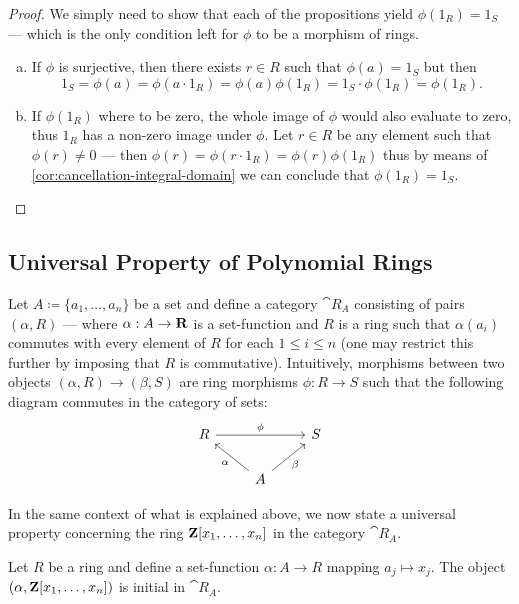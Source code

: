 %
\begin{proof}
    We simply need to show that each of the propositions yield \(\phi(1_R) = 1_S\)
    --- which is the only condition left for \(\phi\) to be a morphism of rings.
    \begin{enumerate}[(a)]\setlength\itemsep{0em}
        \item If \(\phi\) is surjective, then there exists \(r \in R\) such that
              \(\phi(a) = 1_S\) but then
              \[
                  1_S = \phi(a) = \phi(a \cdot 1_R) = \phi(a) \phi(1_R)
                  = 1_S \cdot \phi(1_R) = \phi(1_R).
              \]

        \item If \(\phi(1_R)\) where to be zero, the whole image of \(\phi\) would also
              evaluate to zero, thus \(1_R\) has a non-zero image under \(\phi\). Let
              \(r \in R\) be any element such that \(\phi(r) \neq 0\) --- then
              \(\phi(r) = \phi(r \cdot 1_R) = \phi(r) \phi(1_R)\) thus by means of
              \cref{cor:cancellation-integral-domain} we can conclude that
              \(\phi(1_R) = 1_S\).
    \end{enumerate}
\end{proof}
%

\subsection{Universal Property of Polynomial Rings}

Let \(A \coloneq \{a_1, \dots, a_n\}\) be a set and define a category
\(\cat R_A\) consisting of pairs \((\alpha, R)\) --- where \(\alpha: A \to \mathbf{R}\)
is a set-function and \(R\) is a ring such that \(\alpha(a_i)\) commutes with
every element of \(R\) for each \(1 \leq i \leq n\) (one may restrict this
further by imposing that \(R\) is commutative). Intuitively, morphisms between
two objects \((\alpha, R) \to (\beta, S)\) are ring morphisms \(\phi: R \to S\)
such that the following diagram commutes in the category of sets:
\[
    \begin{tikzcd}
        R \ar[rr, "\phi"] & &S \\
        &A \ar[lu, "\alpha"] \ar[ru, swap, "\beta"] &
    \end{tikzcd}
\]

In the same context of what is explained above, we now state a universal
property concerning the ring \(\mathbf{Z}[x_1, \dots, x_n]\) in the category
\(\cat R_A\).

%
\begin{proposition}
    \label{prop:Z[several]-initial-polynomial-rings}
    Let \(R\) be a ring and define a set-function \(\alpha: A \to R\) mapping
    \(a_j \mapsto x_j\). The object \((\alpha, \mathbf{Z}[x_1, \dots, x_n])\) is initial in
    \(\cat R_A\).
\end{proposition}
%

